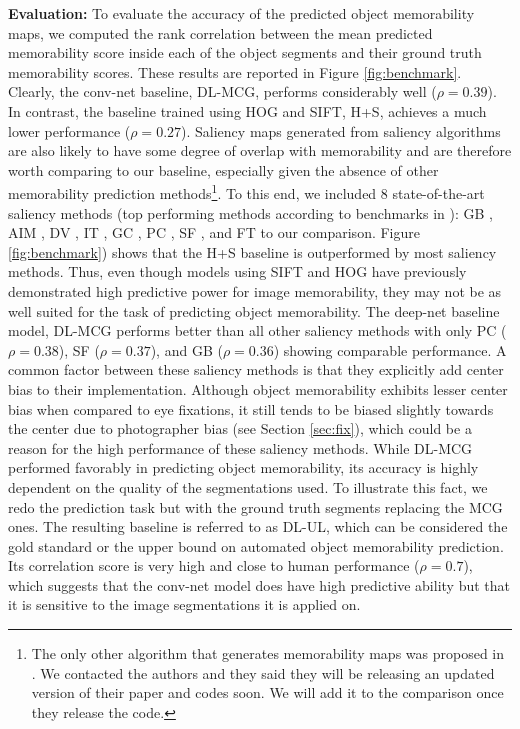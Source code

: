 \vspace{3pt}\noindent \textbf{Evaluation: } To evaluate the accuracy of the predicted object memorability maps, we computed the rank correlation between the mean predicted memorability score inside each of the object segments and their ground truth memorability scores. These results are reported in Figure \ref{fig:benchmark}. Clearly, the conv-net baseline, DL-MCG, performs considerably well ($\rho = 0.39$). In contrast, the baseline trained using HOG and SIFT, H+S, achieves a much lower performance ($\rho = 0.27$). Saliency maps generated from saliency algorithms are also likely to have some degree of overlap with memorability and are therefore worth comparing to our baseline, especially given the absence of other memorability prediction methods\footnote{The only other algorithm that generates memorability maps was proposed in \cite{khosla12}. We contacted the authors and they said they will be releasing an updated version of their paper and codes soon. We will add it to the comparison once they release the code.}. To this end, we included $8$ state-of-the-art saliency methods (top performing methods according to benchmarks in \cite{borji13,borji12}): GB \cite{gb}, AIM \cite{aim}, DV \cite{dv}, IT \cite{it}, GC \cite{gc}, PC \cite{pc}, SF \cite{sf}, and FT \cite{ft} to our comparison. Figure \ref{fig:benchmark}) shows that the H+S baseline is outperformed by most saliency methods. Thus, even though models using SIFT and HOG have previously demonstrated high predictive power for image memorability, they may not be as well suited for the task of predicting object memorability. The deep-net baseline model, DL-MCG performs better than all other saliency methods with only PC ($\rho=0.38$), SF ($\rho=0.37$), and GB ($\rho=0.36$) showing  comparable performance. A common factor between these saliency methods is that they explicitly add center bias to their implementation. Although object memorability exhibits lesser center bias when compared to eye fixations, it still tends to be biased slightly towards the center due to photographer bias (see Section \ref{sec:fix}), which could be a  reason for the high performance of these saliency methods. %
While DL-MCG performed favorably in predicting object memorability, its accuracy is highly dependent on the quality of the segmentations used. To illustrate this fact, we redo the prediction task but with the ground truth segments replacing the MCG ones. The resulting baseline is referred to as DL-UL, which can be considered the gold standard or the upper bound on automated object memorability prediction. Its correlation score is very high  and close to human performance ($\rho = 0.7$), which suggests that the conv-net model does have high predictive ability but that it is sensitive to the image segmentations it is applied on. %

